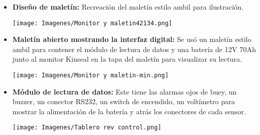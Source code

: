    \begin{itemize}
        \item \textbf{Diseño de maletín:} Recreación del maletín estilo ambil para ilustración.
        \begin{center}
            \texttt{[image: Imagenes/Monitor y maletin42134.png]}
            \label{fig:imagen1}
        \end{center}
        
        \item \textbf{Maletín abierto mostrando la interfaz digital:} Se usó un maletín estilo ambil para contener el módulo de lectura de datos y una batería de 12V 70Ah junto al monitor Kinseal en la tapa del maletín para visualizar su lectura.
        \begin{center}
            \texttt{[image: Imagenes/Monitor y maletin-min.png]}
            \label{fig:imagen2}
        \end{center}
        
        \item \textbf{Módulo de lectura de datos:} Este tiene las alarmas ojos de buey, un buzzer, un conector RS232, un switch de encendido, un voltímetro para mostrar la alimentación de la batería y atrás los conectores de cada sensor.
        \begin{center}
            \texttt{[image: Imagenes/Tablero rev control.png]}
            \label{fig:imagen3}
        \end{center}
    \end{itemize}
    
    